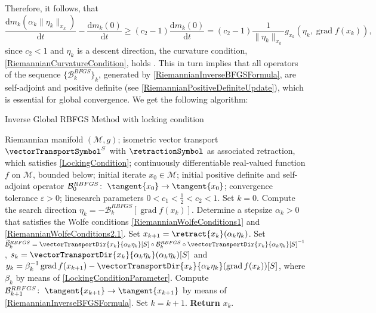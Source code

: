 Therefore, it follows, that
\begin{equation*}
    \frac{\mathrm{d} m_k(\alpha_k \lVert \eta_k \rVert_{x_k})}{\mathrm{d}t} - \frac{\mathrm{d} m_k(0)}{\mathrm{d}t} \geq (c_2 - 1)\frac{\mathrm{d} m_k(0)}{\mathrm{d}t} = (c_2 - 1) \frac{1}{\lVert \eta_k \rVert_{x_k}} g_{x_k} ( \eta_k, \operatorname{grad} f(x_k)),
\end{equation*}
since $c_2 < 1$ and $\eta_k$ is a descent direction, the curvature condition, \cref{RiemannianCurvatureCondition}, holds \cite[p.~1664]{HuangGallivanAbsil:2015}. This in turn implies that all operators of the sequence $\{ \mathcal{B}^{BFGS}_k \}_k$, generated by \cref{RiemannianInverseBFGSFormula}, are self-adjoint and positive definite (see \cref{RiemannianPositiveDefiniteUpdate}), which is essential for global convergence. We get the following algorithm: 

\begin{algorithm}[H]
    \caption{Inverse Global RBFGS Method with locking condition}\label{InverseGlobalRiemannianBFGS-MethodLockingCondition}
    \begin{algorithmic}[1]
        \State Riemannian manifold $(\mathcal{M}, g)$; isometric vector transport $\vectorTransportSymbol^S$ with $\retractionSymbol$ as associated retraction, which satisfies \cref{LockingCondition}; continuously differentiable real-valued function $f$ on $\mathcal{M}$, bounded below; initial iterate $x_0 \in \mathcal{M}$; initial positive definite and self-adjoint operator $\mathcal{B}^{RBFGS}_0 \colon \; \tangent{x_0} \to \tangent{x_0}$; convergence tolerance $\varepsilon > 0$; linesearch parameters $0 < c_1 < \frac{1}{2} < c_2 < 1$. Set $k = 0$.
            \State Compute the search direction $\eta_k = - \mathcal{B}^{RBFGS}_k [\operatorname{grad} f(x_k)]$.
            \State Determine a stepsize $\alpha_k > 0$ that satisfies the Wolfe conditions \cref{RiemannianWolfeConditions1} and \cref{RiemannianWolfeConditions2.1}. 
            \State Set $x_{k+1} = \retract{x_k}(\alpha_k \eta_k)$.
            \State Set $\widetilde{\mathcal{B}}^{RBFGS}_k = \vectorTransportDir{x_k}{\alpha_k \eta_k}[S] \circ \mathcal{B}^{RBFGS}_k \circ {\vectorTransportDir{x_k}{\alpha_k \eta_k}[S]}^{-1}$, $s_k = \vectorTransportDir{x_k}{\alpha_k \eta_k}(\alpha_k \eta_k)[S]$ and 
            \StatexIndent[2] $y_k = \beta^{-1}_k \operatorname{grad} f(x_{k+1}) - \vectorTransportDir{x_k}{\alpha_k \eta_k}(\operatorname{grad} f(x_k))[S]$, where $\beta_k$ by means of \cref{LockingConditionParameter}.
            \State Compute $\mathcal{B}^{RBFGS}_{k+1} \colon \; \tangent{x_{k+1}} \to \tangent{x_{k+1}}$ by means of \cref{RiemannianInverseBFGSFormula}. 
            \State Set $k = k+1$.
        \EndWhile
        \State \textbf{Return} $x_k$.
    \end{algorithmic}
\end{algorithm}

